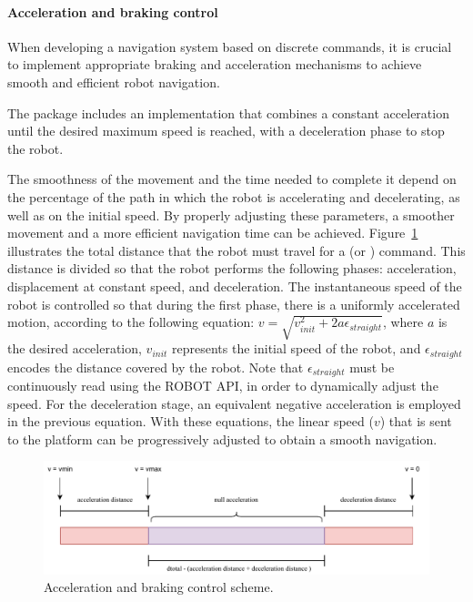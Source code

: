 \paragraph*{\textbf{Acceleration and braking control}}\label{par:start-and-brake-control}

When developing a navigation system based on discrete commands, it is crucial to implement appropriate braking and acceleration mechanisms to achieve smooth and efficient robot navigation.

The package includes an implementation that combines a constant acceleration until the desired maximum speed is reached, with a deceleration phase to stop the robot.

The smoothness of the movement and the time needed to complete it depend on the percentage of the path in which the robot is accelerating and decelerating, as well as on the initial speed.
By properly adjusting these parameters, a smoother movement and a more efficient navigation time can be achieved.
Figure~\ref{fig:acceleration_stop} illustrates the total distance that the robot must travel for a \moveforward (or \movebackward) command.
This distance is divided so that the robot performs the following phases: acceleration, displacement at constant speed, and deceleration.
The instantaneous speed of the robot is controlled so that during the first phase, there is a uniformly accelerated motion, according to the following equation: $v = \sqrt{v_{init}^2 + 2 a \epsilon_{straight}}$, where $a$ is the desired acceleration, $v_{init}$ represents the initial speed of the robot, and $\epsilon_{straight}$ encodes the distance covered by the robot.
Note that $\epsilon_{straight}$ must be continuously read using the ROBOT API, in order to dynamically adjust the speed.
For the deceleration stage, an equivalent negative acceleration is employed in the previous equation.
With these equations, the linear speed ($v$) that is sent to the platform can be progressively adjusted to obtain a smooth navigation.

\begin{figure}
    \centering
    \includegraphics[width=\linewidth]{figures/ros4vsn/move_robot_acceleration}
    \caption{Acceleration and braking control scheme.}
    \label{fig:acceleration_stop}
\end{figure}

